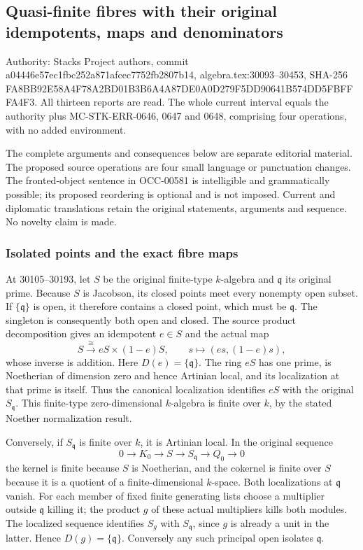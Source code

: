 \subsection{Quasi-finite fibres with their original idempotents, maps and denominators}\label{quasi-finite-fibres-with-their-original-idempotents-maps-and-denominators}

Authority: Stacks Project authors, commit a04446e57ec1fbc252a871afcec7752fb2807b14, algebra.tex:30093--30453, SHA-256 FA8BB92E58A4F78A2BD01B3B6A4A87DE0A0D279F5DD90641B574DD5FBFFFA4F3. All thirteen reports are read. The whole current interval equals the authority plus MC-STK-ERR-0646, 0647 and 0648, comprising four operations, with no added environment.

The complete arguments and consequences below are separate editorial material. The proposed source operations are four small language or punctuation changes. The fronted-object sentence in OCC-00581 is intelligible and grammatically possible; its proposed reordering is optional and is not imposed. Current and diplomatic translations retain the original statements, arguments and sequence. No novelty claim is made.

\subsubsection{Isolated points and the exact fibre maps}\label{isolated-points-and-the-exact-fibre-maps}

At 30105--30193, let \(S\) be the original finite-type \(k\)-algebra and \(\mathfrak q\) its original prime. Because \(S\) is Jacobson, its closed points meet every nonempty open subset. If \(\{\mathfrak q\}\) is open, it therefore contains a closed point, which must be \(\mathfrak q\). The singleton is consequently both open and closed. The source product decomposition gives an idempotent \(e\in S\) and the actual map \[
 S\xrightarrow{\cong}eS\times(1-e)S,\qquad s\longmapsto(es,(1-e)s),
\] whose inverse is addition. Here \(D(e)=\{\mathfrak q\}\). The ring \(eS\) has one prime, is Noetherian of dimension zero and hence Artinian local, and its localization at that prime is itself. Thus the canonical localization identifies \(eS\) with the original \(S_{\mathfrak q}\). This finite-type zero-dimensional \(k\)-algebra is finite over \(k\), by the stated Noether normalization result.

Conversely, if \(S_{\mathfrak q}\) is finite over \(k\), it is Artinian local. In the original sequence \[
 0\to K_0\to S\to S_{\mathfrak q}\to Q_0\to0
\] the kernel is finite because \(S\) is Noetherian, and the cokernel is finite over \(S\) because it is a quotient of a finite-dimensional \(k\)-space. Both localizations at \(\mathfrak q\) vanish. For each member of fixed finite generating lists choose a multiplier outside \(\mathfrak q\) killing it; the product \(g\) of these actual multipliers kills both modules. The localized sequence identifies \(S_g\) with \(S_{\mathfrak q}\), since \(g\) is already a unit in the latter. Hence \(D(g)=\{\mathfrak q\}\). Conversely any such principal open isolates \(\mathfrak q\).


